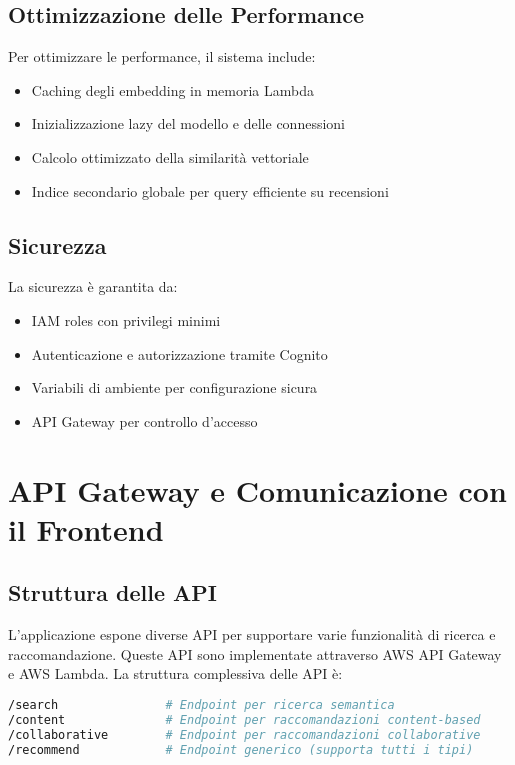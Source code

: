 \documentclass[11pt,a4paper]{article}
\begin{document}
\subsection{Ottimizzazione delle Performance}
Per ottimizzare le performance, il sistema include:

\begin{itemize}
  \item Caching degli embedding in memoria Lambda
  \item Inizializzazione lazy del modello e delle connessioni
  \item Calcolo ottimizzato della similarità vettoriale
  \item Indice secondario globale per query efficiente su recensioni
\end{itemize}

\subsection{Sicurezza}
La sicurezza è garantita da:

\begin{itemize}
  \item IAM roles con privilegi minimi
  \item Autenticazione e autorizzazione tramite Cognito
  \item Variabili di ambiente per configurazione sicura
  \item API Gateway per controllo d'accesso
\end{itemize}

\section{API Gateway e Comunicazione con il Frontend}
\subsection{Struttura delle API}
L'applicazione espone diverse API per supportare varie funzionalità di ricerca e raccomandazione. Queste API sono implementate attraverso AWS API Gateway e AWS Lambda. La struttura complessiva delle API è:

\begin{lstlisting}[language=bash]
/search               # Endpoint per ricerca semantica
/content              # Endpoint per raccomandazioni content-based
/collaborative        # Endpoint per raccomandazioni collaborative
/recommend            # Endpoint generico (supporta tutti i tipi)
\end{lstlisting}
\end{document}
